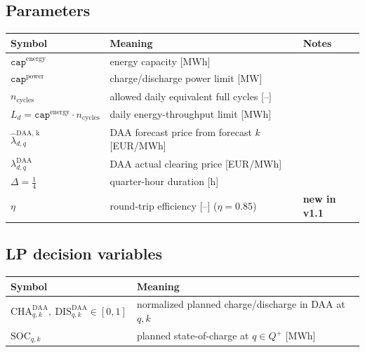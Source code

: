 \documentclass{article}
\numberwithin{equation}{subsection}
\begin{document}
\subsection*{Parameters}
\begingroup
\renewcommand{\arraystretch}{1.25}
\begin{tabular}{@{}lll@{}}
\toprule
Symbol & Meaning & Notes \\
\midrule
\(\texttt{cap}^{\text{energy}}\) & energy capacity [MWh] & \\
\(\texttt{cap}^{\text{power}}\) & charge/discharge power limit [MW] & \\
\(n_{\text{cycles}}\) & allowed daily equivalent full cycles [--] & \\
\(L_d =\texttt{cap}^{\text{energy}}\cdot n_{\text{cycles}}\) & daily energy-throughput limit [MWh] & \\
\(\hat{\lambda}^{\text{DAA, k}}_{d,q}\) & DAA forecast price from forecast \(k\) [EUR/MWh] & \\
\(\lambda^{\text{DAA}}_{d,q}\) & DAA actual clearing price [EUR/MWh] & \\
\(\Delta=\tfrac{1}{4}\) & quarter-hour duration [h] & \\
\(\eta\) & round-trip efficiency [--] (\(\eta=0.85\)) & \textbf{new in v1.1} \\
\bottomrule
\end{tabular}
\endgroup

\subsection*{LP decision variables}
\begingroup
\renewcommand{\arraystretch}{1.5}
\begin{tabular}{@{}ll@{}}
\toprule
Symbol & Meaning \\
\midrule
\(\mathrm{CHA}^{\text{DAA}}_{q,k},\ \mathrm{DIS}^{\text{DAA}}_{q,k} \in [0,1]\) & normalized planned charge/discharge in DAA at \(q,k\) \\
\(\mathrm{SOC}_{q,k}\) & planned state-of-charge at \(q\in Q^+\) [MWh] \\
\bottomrule
\end{tabular}
\endgroup
\end{document}
